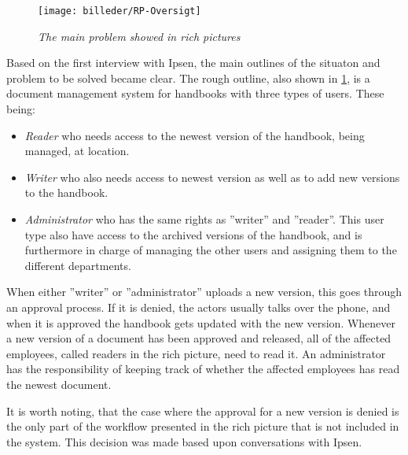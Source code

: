 \begin{figure}[H]
	\centering
	\texttt{[image: billeder/RP-Oversigt]}
	\caption{\textit{The main problem showed in rich pictures
	}}
	\label{fig:RP-Oversigt}
\end{figure}

Based on the first interview with Ipsen, the main outlines of the situaton and problem to be solved became clear.
The rough outline, also shown in \cref{fig:RP-Oversigt}, is a document management system for handbooks with three types of users. These being:
\begin{itemize}
	\item
		\textit{Reader} who needs access to the newest version of the handbook, being managed, at location.
	\item
		\textit{Writer} who also needs access to newest version as well as to add new versions to the handbook.
	\item
		\textit{Administrator} who has the same rights as ''writer'' and ''reader''.
		This user type also have access to the archived versions of the handbook, and is furthermore in charge of managing the other users and assigning them to the different departments.
\end{itemize}
When either ''writer'' or ''administrator'' uploads a new version, this goes through an approval process.
If it is denied, the actors usually talks over the phone, and when it is approved the handbook gets updated with the new version.
Whenever a new version of a document has been approved and released, all of the affected employees, called readers in the rich picture, need to read it.
An administrator has the responsibility of keeping track of whether the affected employees has read the newest document.


It is worth noting, that the case where the approval for a new version is denied is the only part of the workflow presented in the rich picture that is not included in the system.
This decision was made based upon conversations with Ipsen.

